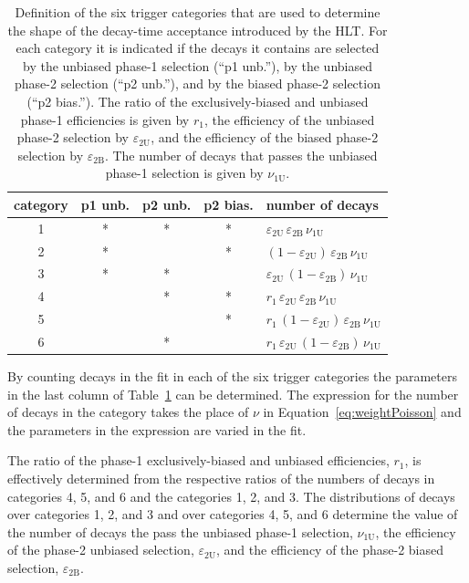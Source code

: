 \begin{table}[tbp]
  \centering
  \caption{Definition of the six trigger categories that are used to determine the shape of the decay-time acceptance
           introduced by the HLT.
           For each category it is indicated if the decays it contains are selected by the unbiased phase-1 selection (``p1 unb.''),
           by the unbiased phase-2 selection (``p2 unb.''), and by the biased phase-2 selection (``p2 bias.'').
           The ratio of the exclusively-biased and unbiased phase-1 efficiencies is given by $r_\text{1}$,
           the efficiency of the unbiased phase-2 selection by $\varepsilon_\text{2U}$,
           and the efficiency of the biased phase-2 selection by $\varepsilon_\text{2B}$.
           The number of decays that passes the unbiased phase-1 selection is given by $\nu_\text{1U}$.}
  \label{tab:triggerCats}
  \begin{tabular}{ccccl}
    \hline
    category  &  p1 unb.  &  p2 unb.  &  p2 bias.  &  number of decays  \\
    \hline
    1  &  *  &  *  &  *
       &  $\varepsilon_\text{2U}\, \varepsilon_\text{2B}\, \nu_\text{1U}$  \\
    2  &  *  &     &  *
       &  $(1-\varepsilon_\text{2U})\, \varepsilon_\text{2B}\, \nu_\text{1U}$  \\
    3  &  *  &  *  &
       &  $\varepsilon_\text{2U}\, (1-\varepsilon_\text{2B})\, \nu_\text{1U}$  \\
    4  &     &  *  &  *
       &  $r_\text{1}\, \varepsilon_\text{2U}\, \varepsilon_\text{2B}\, \nu_\text{1U}$  \\
    5  &     &     &  *
       &  $r_\text{1}\, (1-\varepsilon_\text{2U})\, \varepsilon_\text{2B}\, \nu_\text{1U}$  \\
    6  &     &  *  &
       &  $r_\text{1}\, \varepsilon_\text{2U}\, (1-\varepsilon_\text{2B})\, \nu_\text{1U}$  \\
    \hline
  \end{tabular}
\end{table}

By counting decays in the fit in each of the six trigger categories the parameters in the last column of Table~\ref{tab:triggerCats} can be
determined. The expression for the number of decays in the category takes the place of $\nu$ in Equation~\ref{eq:weightPoisson} and the
parameters in the expression are varied in the fit.

The ratio of the phase-1 exclusively-biased and unbiased efficiencies, $r_\text{1}$, is effectively determined from the respective ratios
of the numbers of decays in categories 4, 5, and 6 and the categories 1, 2, and 3. The distributions of decays over categories 1, 2, and 3
and over categories 4, 5, and 6 determine the value of the number of decays the pass the unbiased phase-1 selection, $\nu_\text{1U}$, the
efficiency of the phase-2 unbiased selection, $\varepsilon_\text{2U}$, and the efficiency of the  phase-2 biased selection,
$\varepsilon_\text{2B}$.

